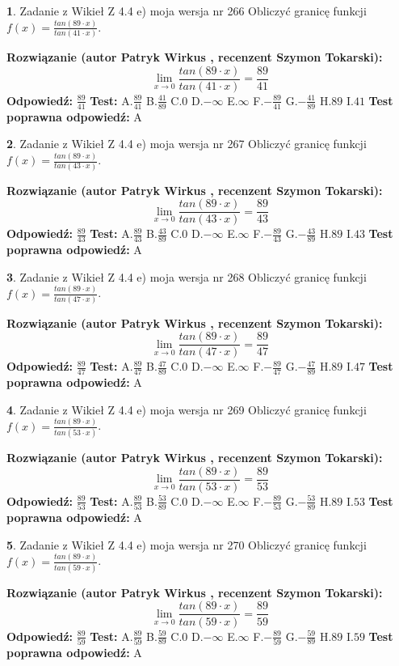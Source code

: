 \documentclass[12pt, a4paper]{article}
\theoremstyle{definition} %
\newtheorem{zad}{}
\newcommand{\zadStart}[1]{\begin{zad}#1\newline}
\newcommand{\zadStop}{\end{zad}}
\newcommand{\rozwStart}[2]{\noindent \textbf{Rozwiązanie (autor #1 , recenzent #2): }\newline}
\newcommand{\rozwStop}{\newline}
\newcommand{\odpStart}{\noindent \textbf{Odpowiedź:}\newline}
\newcommand{\odpStop}{\newline}
\newcommand{\testStart}{\noindent \textbf{Test:}\newline}
\newcommand{\testStop}{\newline}
\newcommand{\kluczStart}{\noindent \textbf{Test poprawna odpowiedź:}\newline}
\newcommand{\kluczStop}{\newline}
\begin{document}
\zadStart{Zadanie z Wikieł Z 4.4 e) moja wersja nr 266}
Obliczyć granicę funkcji $f(x)=\frac{tan(89\cdot x)}{tan(41\cdot x)}$.
\zadStop
\rozwStart{Patryk Wirkus}{Szymon Tokarski}
$$\lim\limits_{x\to 0}\frac{tan(89\cdot x)}{tan(41\cdot x)}=
\frac{89}{41}$$
\rozwStop
\odpStart
$\frac{89}{41}$
\odpStop
\testStart
A.$\frac{89}{41}$
B.$\frac{41}{89}$
C.$0$
D.$-\infty$
E.$\infty$
F.$-\frac{89}{41}$
G.$-\frac{41}{89}$
H.$89$
I.$41$
\testStop
\kluczStart
A
\kluczStop



\zadStart{Zadanie z Wikieł Z 4.4 e) moja wersja nr 267}
Obliczyć granicę funkcji $f(x)=\frac{tan(89\cdot x)}{tan(43\cdot x)}$.
\zadStop
\rozwStart{Patryk Wirkus}{Szymon Tokarski}
$$\lim\limits_{x\to 0}\frac{tan(89\cdot x)}{tan(43\cdot x)}=
\frac{89}{43}$$
\rozwStop
\odpStart
$\frac{89}{43}$
\odpStop
\testStart
A.$\frac{89}{43}$
B.$\frac{43}{89}$
C.$0$
D.$-\infty$
E.$\infty$
F.$-\frac{89}{43}$
G.$-\frac{43}{89}$
H.$89$
I.$43$
\testStop
\kluczStart
A
\kluczStop



\zadStart{Zadanie z Wikieł Z 4.4 e) moja wersja nr 268}
Obliczyć granicę funkcji $f(x)=\frac{tan(89\cdot x)}{tan(47\cdot x)}$.
\zadStop
\rozwStart{Patryk Wirkus}{Szymon Tokarski}
$$\lim\limits_{x\to 0}\frac{tan(89\cdot x)}{tan(47\cdot x)}=
\frac{89}{47}$$
\rozwStop
\odpStart
$\frac{89}{47}$
\odpStop
\testStart
A.$\frac{89}{47}$
B.$\frac{47}{89}$
C.$0$
D.$-\infty$
E.$\infty$
F.$-\frac{89}{47}$
G.$-\frac{47}{89}$
H.$89$
I.$47$
\testStop
\kluczStart
A
\kluczStop



\zadStart{Zadanie z Wikieł Z 4.4 e) moja wersja nr 269}
Obliczyć granicę funkcji $f(x)=\frac{tan(89\cdot x)}{tan(53\cdot x)}$.
\zadStop
\rozwStart{Patryk Wirkus}{Szymon Tokarski}
$$\lim\limits_{x\to 0}\frac{tan(89\cdot x)}{tan(53\cdot x)}=
\frac{89}{53}$$
\rozwStop
\odpStart
$\frac{89}{53}$
\odpStop
\testStart
A.$\frac{89}{53}$
B.$\frac{53}{89}$
C.$0$
D.$-\infty$
E.$\infty$
F.$-\frac{89}{53}$
G.$-\frac{53}{89}$
H.$89$
I.$53$
\testStop
\kluczStart
A
\kluczStop



\zadStart{Zadanie z Wikieł Z 4.4 e) moja wersja nr 270}
Obliczyć granicę funkcji $f(x)=\frac{tan(89\cdot x)}{tan(59\cdot x)}$.
\zadStop
\rozwStart{Patryk Wirkus}{Szymon Tokarski}
$$\lim\limits_{x\to 0}\frac{tan(89\cdot x)}{tan(59\cdot x)}=
\frac{89}{59}$$
\rozwStop
\odpStart
$\frac{89}{59}$
\odpStop
\testStart
A.$\frac{89}{59}$
B.$\frac{59}{89}$
C.$0$
D.$-\infty$
E.$\infty$
F.$-\frac{89}{59}$
G.$-\frac{59}{89}$
H.$89$
I.$59$
\testStop
\kluczStart
A
\kluczStop
\end{document}
